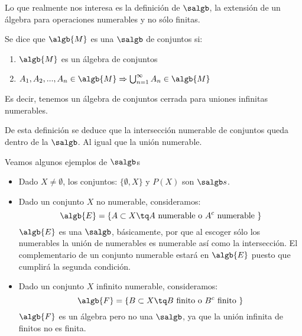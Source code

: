\documentclass{apuntes}
\begin{document}
Lo que realmente nos interesa es la definición de $\salgb$, la extensión de un álgebra para operaciones numerables y no sólo finitas.

\begin{defn}[{σ}-álgebra]
Se dice que $\algb{M}$ es una $\salgb$ de conjuntos si:
\begin{enumerate}
\item $\algb{M}$ es un álgebra de conjuntos
\item $A_1,A_2,...,A_n \in \algb{M} \Rightarrow \bigcup_{n=1}^{\infty} A_n\in \algb{M}$
\end{enumerate}
Es decir, tenemos un álgebra de conjuntos cerrada para uniones infinitas numerables.

\end{defn}

De esta definición se deduce que la intersección numerable de conjuntos queda dentro de la $\salgb$. Al igual que la unión numerable.

\begin{example}
Veamos algunos ejemplos de $\salgb$s
\begin{itemize}
\item Dado $X\neq \emptyset$, los conjuntos: $\lbrace \emptyset, X \rbrace$  y $P(X)$ son $\salgb s$.

\item Dado un conjunto $X$ no numerable, consideramos:
\[\algb{E}=\lbrace A \subset X \tq A \text{ numerable o } A^c \text{ numerable }\rbrace\]
$\algb{E}$ es una $\salgb$, básicamente, por que al escoger sólo los numerables la unión de numerables es numerable así como la intersección. El complementario de un conjunto numerable estará en $\algb{E}$ puesto que cumplirá la segunda condición.


\item Dado un conjunto $X$ infinito numerable, consideramos:
\[\algb{F}=\lbrace B \subset X \tq B \text{ finito o } B^c \text{ finito }\rbrace\]
$\algb{F}$ es un álgebra pero no una $\salgb$, ya que la unión infinita de finitos no es finita.
\end{itemize}
\end{example}
\end{document}
